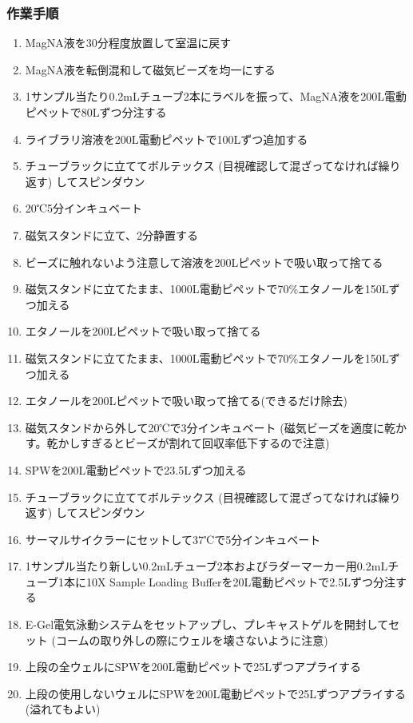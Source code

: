\documentclass[titlepage,10pt,a4paper,uplatex]{jsbook}
\begin{document}
\subsubsection{作業手順}
\begin{enumerate}
\item MagNA液を30分程度放置して室温に戻す
\item MagNA液を転倒混和して磁気ビーズを均一にする
\item 1サンプル当たり0.2mLチューブ2本にラベルを振って、MagNA液を200{\textmu}L電動ピペットで80{\textmu}Lずつ分注する
\item ライブラリ溶液を200{\textmu}L電動ピペットで100{\textmu}Lずつ追加する
\item チューブラックに立ててボルテックス (目視確認して混ざってなければ繰り返す) してスピンダウン
\item 20℃5分インキュベート
\item 磁気スタンドに立て、2分静置する
\item ビーズに触れないよう注意して溶液を200{\textmu}Lピペットで吸い取って捨てる
\item 磁気スタンドに立てたまま、1000{\textmu}L電動ピペットで70\%エタノールを150{\textmu}Lずつ加える
\item エタノールを200{\textmu}Lピペットで吸い取って捨てる
\item 磁気スタンドに立てたまま、1000{\textmu}L電動ピペットで70\%エタノールを150{\textmu}Lずつ加える
\item エタノールを200{\textmu}Lピペットで吸い取って捨てる(できるだけ除去)
\item 磁気スタンドから外して20℃で3分インキュベート (磁気ビーズを適度に乾かす。乾かしすぎるとビーズが割れて回収率低下するので注意)
\item SPWを200{\textmu}L電動ピペットで23.5{\textmu}Lずつ加える
\item チューブラックに立ててボルテックス (目視確認して混ざってなければ繰り返す) してスピンダウン
\item サーマルサイクラーにセットして37℃で5分インキュベート
\item 1サンプル当たり新しい0.2mLチューブ2本およびラダーマーカー用0.2mLチューブ1本に10X Sample Loading Bufferを20{\textmu}L電動ピペットで2.5{\textmu}Lずつ分注する
\item E-Gel電気泳動システムをセットアップし、プレキャストゲルを開封してセット (コームの取り外しの際にウェルを壊さないように注意)
\item 上段の全ウェルにSPWを200{\textmu}L電動ピペットで25{\textmu}Lずつアプライする
\item 上段の使用しないウェルにSPWを200{\textmu}L電動ピペットで25{\textmu}Lずつアプライする (溢れてもよい)

\end{enumerate}
\end{document}
